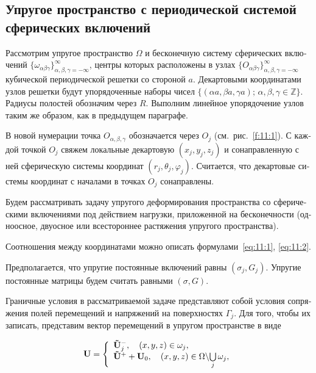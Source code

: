 \begin{russian}
\section[Упругое пространство с периодической системой сферических включений]{Упругое пространство с периодической системой сферических включений}

Рассмотрим упругое пространство $\Omega$ и бесконечную систему сферических включений $\{\omega_{\alpha\beta\gamma}\}_{\alpha,\beta,\gamma=-\infty}^\infty$, центры которых расположены в узлах $\{O_{\alpha\beta\gamma}\}_{\alpha,\beta,\gamma=-\infty}^\infty$ кубической периодической решетки со стороной $a$. Декартовыми координатами узлов решетки будут упорядоченные наборы чисел $\{(\alpha a,\beta a,\gamma a);\,\alpha,\beta,\gamma\in\mathbb{Z}\}$. Радиусы полостей обозначим через $R$. Выполним линейное упорядочение узлов таким же образом, как в предыдущем параграфе.\sloppy

В новой нумерации точка $O_{\alpha,\beta,\gamma}$ обозначается через $O_j$ (см.~рис.~\ref{f:11:1}). С каждой точкой $O_j$ свяжем локальные декартовую $(x_j,y_j,z_j)$ и сонаправленную с ней сферическую системы координат $(r_j,\theta_j,\varphi_j)$. Считается, что декартовые системы координат с началами в точках $O_j$ сонаправлены.

Будем рассматривать задачу упругого деформирования пространства со сферическими включениями под действием нагрузки, приложенной на бесконечности (одноосное, двуосное или всестороннее растяжения упругого пространства).

Соотношения между координатами можно описать формулами~\eqref{eq:11:1}, \eqref{eq:11:2}.

Предполагается, что упругие постоянные включений равны $(\sigma_j,G_j)$. Упругие постоянные матрицы будем считать равными $(\sigma,G)$.

Граничные условия в рассматриваемой задаче представляют собой условия сопряжения полей перемещений и напряжений на поверхностях $\Gamma_j$. Для того, чтобы их записать, представим вектор перемещений в упругом пространстве в виде

\begin{equation}
{\bf{U}} = \left\{ {\begin{array}{*{20}{l}}
{{\bf{\tilde U}}_j^ - ,\quad \left( {x,y,z} \right) \in \omega_j,}\\
{{{{\bf{\tilde U}}}^ + } + {{\bf{U}}_0},\quad \left( {x,y,z} \right) \in\Omega\backslash {\bigcup\limits_j\omega_j},}
\end{array}} \right.
\label{eq:11:23}
\end{equation}


\end{russian}
